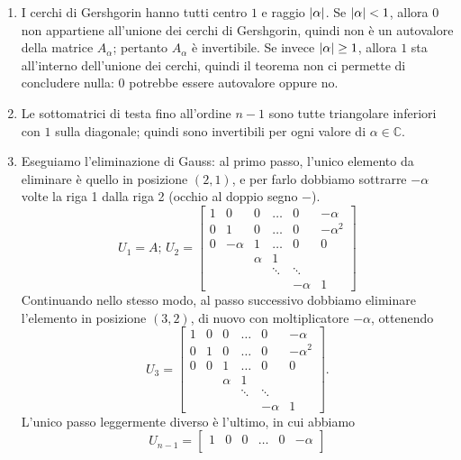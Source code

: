\documentclass[a4paper]{report}
\DeclarePairedDelimiter{\abs}{\lvert}{\rvert}
\theoremstyle{definiton}
\theoremstyle{remark}
\begin{document}
\begin{enumerate}
    \item I cerchi di Gershgorin hanno tutti centro $1$ e raggio $\abs{\alpha}$. Se $\abs{\alpha} < 1$, allora $0$ non appartiene all'unione dei cerchi di Gershgorin, quindi non è un autovalore della matrice $A_\alpha$; pertanto $A_\alpha$ è invertibile. Se invece $\abs{\alpha} \geq 1$, allora $1$ sta all'interno dell'unione dei cerchi, quindi il teorema non ci permette di concludere nulla: $0$ potrebbe essere autovalore oppure no.
    \item Le sottomatrici di testa fino all'ordine $n-1$ sono tutte triangolare inferiori con $1$ sulla diagonale; quindi sono invertibili per ogni valore di $\alpha\in\mathbb{C}$.
    \item Eseguiamo l'eliminazione di Gauss: al primo passo, l'unico elemento da eliminare è quello in posizione $(2,1)$, e per farlo dobbiamo sottrarre $-\alpha$ volte la riga 1 dalla riga 2 (occhio al doppio segno $-$).
    \[
        U_1 = A; \, U_2 = \begin{bmatrix}
            1  & 0 &  0& \dots  & 0 &  -\alpha\\
            0 & 1 & 0 & \dots & 0 & -\alpha^2\\
            0& -\alpha & 1 & \dots  & 0 & 0\\
            & & \alpha & 1\\
            & & & \ddots & \ddots & \\
            & & &  &-\alpha & 1      
        \end{bmatrix}
    \]
    Continuando nello stesso modo, al passo successivo dobbiamo eliminare l'elemento in posizione $(3,2)$, di nuovo con moltiplicatore $-\alpha$, ottenendo
    \[
        U_3 = \begin{bmatrix}
            1  & 0 &  0& \dots  & 0 &  -\alpha\\
            0 & 1 & 0 & \dots & 0 & -\alpha^2\\
            0& 0 & 1 & \dots  & 0 & 0\\
            & & \alpha & 1\\
            & & & \ddots & \ddots & \\
            & & &  &-\alpha & 1      
        \end{bmatrix}.
    \]
    L'unico passo leggermente diverso è l'ultimo, in cui abbiamo
    \[
        U_{n-1} = \begin{bmatrix}
            1  & 0 &  0& \dots  & 0 &  -\alpha\\

\end{bmatrix}\]
\end{enumerate}
\end{document}
